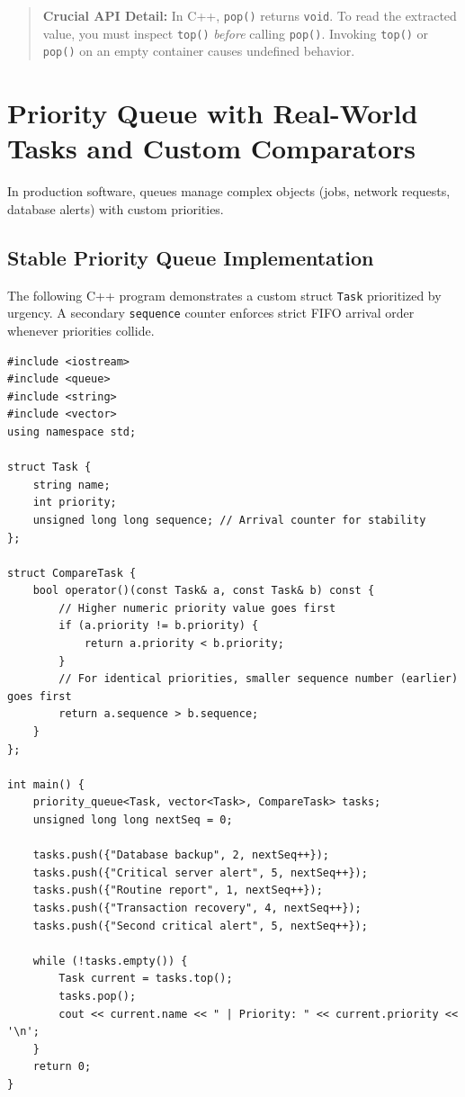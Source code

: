\begin{quote}
\textbf{Crucial API Detail:} In C++, \texttt{pop()} returns \texttt{void}. To read the extracted value, you must inspect \texttt{top()} \emph{before} calling \texttt{pop()}. Invoking \texttt{top()} or \texttt{pop()} on an empty container causes undefined behavior.
\end{quote}

\section{Priority Queue with Real-World Tasks and Custom Comparators}

In production software, queues manage complex objects (jobs, network requests, database alerts) with custom priorities.

\subsection{Stable Priority Queue Implementation}

The following C++ program demonstrates a custom struct \texttt{Task} prioritized by urgency. A secondary \texttt{sequence} counter enforces strict FIFO arrival order whenever priorities collide.

\begin{lstlisting}[style=cppstyle]
#include <iostream>
#include <queue>
#include <string>
#include <vector>
using namespace std;

struct Task {
    string name;
    int priority;
    unsigned long long sequence; // Arrival counter for stability
};

struct CompareTask {
    bool operator()(const Task& a, const Task& b) const {
        // Higher numeric priority value goes first
        if (a.priority != b.priority) {
            return a.priority < b.priority;
        }
        // For identical priorities, smaller sequence number (earlier) goes first
        return a.sequence > b.sequence;
    }
};

int main() {
    priority_queue<Task, vector<Task>, CompareTask> tasks;
    unsigned long long nextSeq = 0;

    tasks.push({"Database backup", 2, nextSeq++});
    tasks.push({"Critical server alert", 5, nextSeq++});
    tasks.push({"Routine report", 1, nextSeq++});
    tasks.push({"Transaction recovery", 4, nextSeq++});
    tasks.push({"Second critical alert", 5, nextSeq++});

    while (!tasks.empty()) {
        Task current = tasks.top();
        tasks.pop();
        cout << current.name << " | Priority: " << current.priority << '\n';
    }
    return 0;
}
\end{lstlisting}

